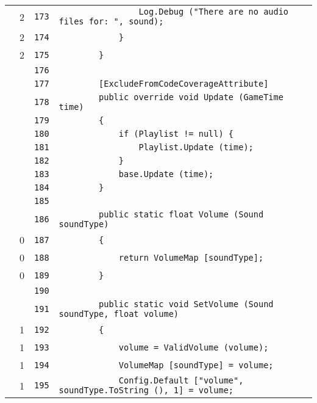\documentclass[a4paper,10pt]{article}
\begin{document}
\begin{longtable}[l]{lrrl}
\cellcolor{green} & 2 & \verb~173~ & \verb~                Log.Debug ("There are no audio files for: ", sound);~\\
\cellcolor{green} & 2 & \verb~174~ & \verb~            }~\\
\cellcolor{green} & 2 & \verb~175~ & \verb~        }~\\
\cellcolor{gray} &  & \verb~176~ & \verb~~\\
\cellcolor{gray} &  & \verb~177~ & \verb~        [ExcludeFromCodeCoverageAttribute]~\\
\cellcolor{gray} &  & \verb~178~ & \verb~        public override void Update (GameTime time)~\\
\cellcolor{gray} &  & \verb~179~ & \verb~        {~\\
\cellcolor{gray} &  & \verb~180~ & \verb~            if (Playlist != null) {~\\
\cellcolor{gray} &  & \verb~181~ & \verb~                Playlist.Update (time);~\\
\cellcolor{gray} &  & \verb~182~ & \verb~            }~\\
\cellcolor{gray} &  & \verb~183~ & \verb~            base.Update (time);~\\
\cellcolor{gray} &  & \verb~184~ & \verb~        }~\\
\cellcolor{gray} &  & \verb~185~ & \verb~~\\
\cellcolor{gray} &  & \verb~186~ & \verb~        public static float Volume (Sound soundType)~\\
\cellcolor{red} & 0 & \verb~187~ & \verb~        {~\\
\cellcolor{red} & 0 & \verb~188~ & \verb~            return VolumeMap [soundType];~\\
\cellcolor{red} & 0 & \verb~189~ & \verb~        }~\\
\cellcolor{gray} &  & \verb~190~ & \verb~~\\
\cellcolor{gray} &  & \verb~191~ & \verb~        public static void SetVolume (Sound soundType, float volume)~\\
\cellcolor{green} & 1 & \verb~192~ & \verb~        {~\\
\cellcolor{green} & 1 & \verb~193~ & \verb~            volume = ValidVolume (volume);~\\
\cellcolor{green} & 1 & \verb~194~ & \verb~            VolumeMap [soundType] = volume;~\\
\cellcolor{green} & 1 & \verb~195~ & \verb~            Config.Default ["volume", soundType.ToString (), 1] = volume;~\\

\end{longtable}
\end{document}
